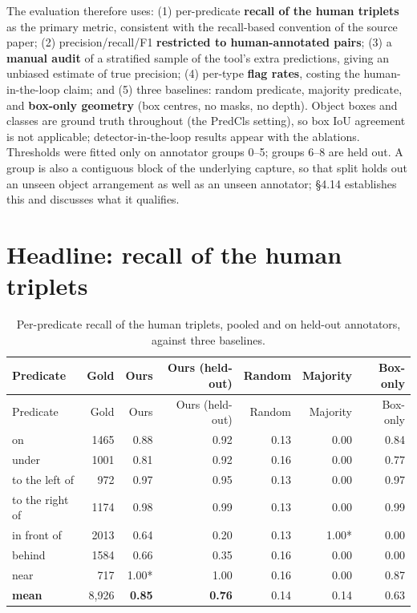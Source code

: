 The evaluation therefore uses: (1) per-predicate \textbf{recall of the human triplets} as the primary metric, consistent with the recall-based convention of the source paper; (2) precision/recall/F1 \textbf{restricted to human-annotated pairs}; (3) a \textbf{manual audit} of a stratified sample of the tool's extra predictions, giving an unbiased estimate of true precision; (4) per-type \textbf{flag rates}, costing the human-in-the-loop claim; and (5) three baselines: random predicate, majority predicate, and \textbf{box-only geometry} (box centres, no masks, no depth). Object boxes and classes are ground truth throughout (the PredCls setting), so box IoU agreement is not applicable; detector-in-the-loop results appear with the ablations. Thresholds were fitted only on annotator groups 0--5; groups 6--8 are held out. A group is also a contiguous block of the underlying capture, so that split holds out an unseen object arrangement as well as an unseen annotator; \S4.14 establishes this and discusses what it qualifies.

\section{Headline: recall of the human triplets}

\begin{center}
\small
\begin{longtable}{lrrrrrr}
\caption{Per-predicate recall of the human triplets, pooled and on held-out annotators, against three baselines.}\\
\hline
Predicate & Gold & Ours & Ours (held-out) & Random & Majority & Box-only \\
\hline
\endfirsthead
\hline
Predicate & Gold & Ours & Ours (held-out) & Random & Majority & Box-only \\
\hline
\endhead
on & 1465 & 0.88 & 0.92 & 0.13 & 0.00 & 0.84 \\
under & 1001 & 0.81 & 0.92 & 0.16 & 0.00 & 0.77 \\
to the left of & 972 & 0.97 & 0.95 & 0.13 & 0.00 & 0.97 \\
to the right of & 1174 & 0.98 & 0.99 & 0.13 & 0.00 & 0.99 \\
in front of & 2013 & 0.64 & 0.20 & 0.13 & 1.00* & 0.00 \\
behind & 1584 & 0.66 & 0.35 & 0.16 & 0.00 & 0.00 \\
near & 717 & 1.00* & 1.00 & 0.16 & 0.00 & 0.87 \\
\textbf{mean} & 8,926 & \textbf{0.85} & \textbf{0.76} & 0.14 & 0.14 & 0.63 \\
\hline
\end{longtable}
\end{center}

